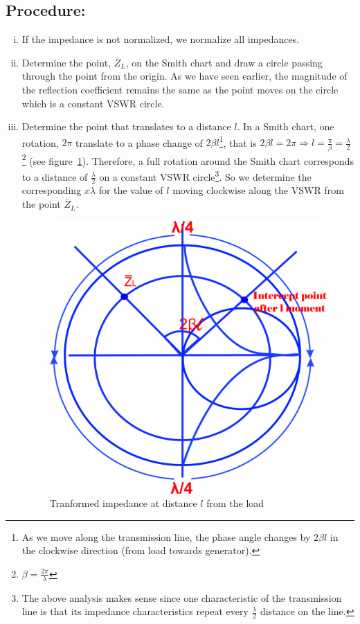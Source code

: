\subsection*{Procedure:}
\begin{enumerate}[(i)]
\item If the impedance is not normalized, we normalize all impedances.
\item Determine the point, $\bar{Z}_L$, on the Smith chart and draw a circle passing through the point from the origin. As we have seen earlier, the magnitude of the reflection coefficient remains the same as the point moves on the circle which is a constant VSWR circle.
\item Determine the point that translates to a distance $l$. In a Smith chart, one rotation, $2\pi$ translate to a phase change of $2\beta{l}$\footnote{
As we move along the transmission line, the phase angle changes by $2\beta{l}$ in the clockwise direction (from load towards generator).
}, that is $2\beta{l} = 2\pi\Longrightarrow l = \frac{\pi}{\beta} = \frac{\lambda}{2}$\footnote{
$\beta = \frac{2\pi}{\lambda}$
} (see figure~\ref{fig:mjhtre}). Therefore, a full rotation around the Smith chart corresponds to a distance of $\frac{\lambda}{2}$ on a constant VSWR circle\footnote{
The above analysis makes sense since one characteristic of the transmission line is that its impedance characteristics repeat every $\frac{\lambda}{2}$ distance on the line.
}. So we determine the corresponding $x\lambda$ for the value of $l$ moving clockwise along the VSWR from the point $\bar{Z}_L$.
\begin{figure}[h]
\centering
\includegraphics[width=0.7\linewidth]{graphics/mjhtre}
\caption{Tranformed impedance at distance $l$ from the load}
\label{fig:mjhtre}
\end{figure}


\end{enumerate}
